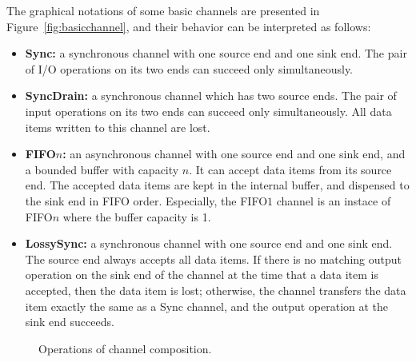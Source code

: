 \documentclass[preprint,3p]{elsarticle}
\begin{document}
The graphical notations of some basic channels are presented in Figure~\ref{fig:basicchannel}, and their behavior can be interpreted as follows:
\begin{itemize}
\item{\textbf{Sync:} a synchronous channel with one source end and one sink end. The pair of I/O operations on its two ends can succeed only simultaneously.}
\item{\textbf{SyncDrain:} a synchronous channel which has two source ends.
 The pair of input operations on its two ends can succeed only simultaneously.
 All data items written to this channel are lost.}
\item{\textbf{FIFO$n$:} an asynchronous channel with one source end and one sink end, and a bounded buffer with capacity $n$.
It can accept data items from its source end. The accepted data items are kept in the internal buffer, and dispensed to
the sink end in FIFO order.
Especially, the FIFO$1$ channel is an instace of FIFO$n$ where the buffer capacity is 1.}
\item{\textbf{LossySync:} a synchronous channel with one source end
    and one sink end. The source end always accepts all data items. If
    there is no matching output operation on the sink end of the
    channel at the time that a data item is accepted, then the data
    item is lost; otherwise, the channel transfers the data item
    exactly the same as a Sync channel, and the output operation at the sink end succeeds.}
\end{itemize}

\begin{figure}[ht]
\centering
{}
\caption{Operations of channel composition.}\label{fig:channelcomposition}
\end{figure}
\end{document}
